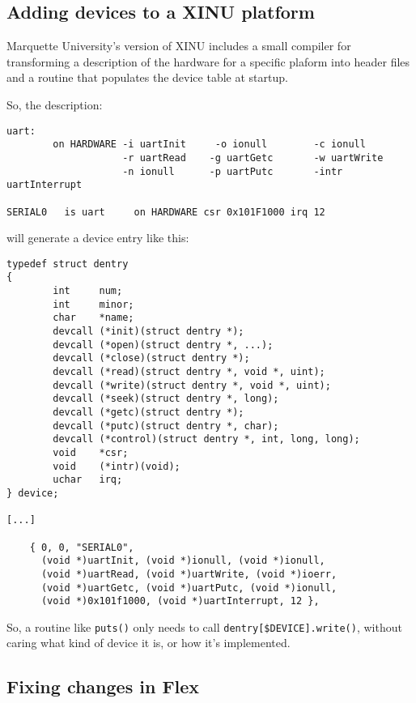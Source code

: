 \documentclass[12pt]{article}
\newcommand{\code}[1]{{\tt #1}}
\begin{document}
\subsection{Adding devices to a XINU platform}

Marquette University's version of XINU includes a small compiler for
transforming a description of the hardware for a specific plaform into header
files and a routine that populates the device table at startup.

So, the description:

\begin{verbatim}
uart:
        on HARDWARE -i uartInit     -o ionull        -c ionull
                    -r uartRead    -g uartGetc       -w uartWrite 
                    -n ionull      -p uartPutc       -intr uartInterrupt

SERIAL0   is uart     on HARDWARE csr 0x101F1000 irq 12
\end{verbatim}

will generate a device entry like this:

\begin{verbatim}
typedef struct dentry
{
        int     num;
        int     minor;
        char    *name;
        devcall (*init)(struct dentry *);
        devcall (*open)(struct dentry *, ...);
        devcall (*close)(struct dentry *);
        devcall (*read)(struct dentry *, void *, uint);
        devcall (*write)(struct dentry *, void *, uint);
        devcall (*seek)(struct dentry *, long);
        devcall (*getc)(struct dentry *);
        devcall (*putc)(struct dentry *, char);
        devcall (*control)(struct dentry *, int, long, long);
        void    *csr;
        void    (*intr)(void);
        uchar   irq;
} device;

[...]

	{ 0, 0, "SERIAL0",
	  (void *)uartInit, (void *)ionull, (void *)ionull,
	  (void *)uartRead, (void *)uartWrite, (void *)ioerr,
	  (void *)uartGetc, (void *)uartPutc, (void *)ionull,
	  (void *)0x101f1000, (void *)uartInterrupt, 12 },
\end{verbatim}

So, a routine like \code{puts()} only needs to call
\code{dentry[\$DEVICE].write()}, without caring what kind of device it is, or
how it's implemented.

\subsection{Fixing changes in Flex}
\end{document}
